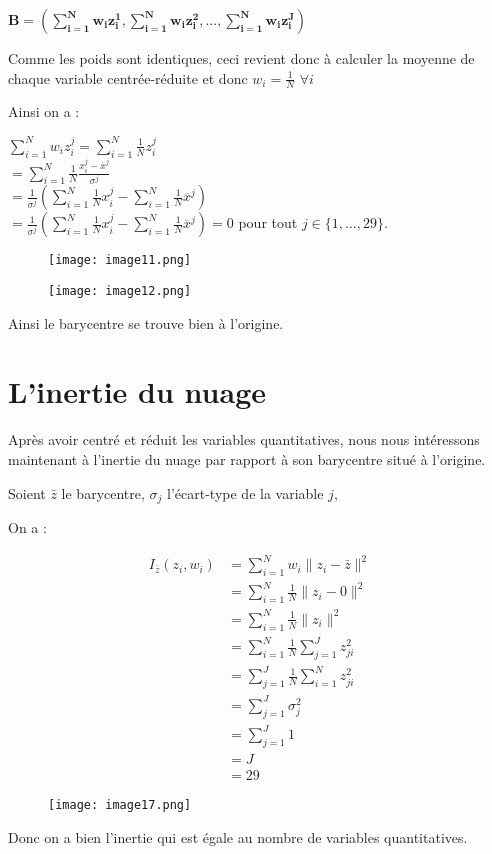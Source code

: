 \documentclass{article}
\begin{document}
$\mathbf{B=(\sum_{i=1}^{N}w_{i}z_{i}^{1},\sum_{i=1}^{N}w_{i}z_{i}^{2},...,\sum_{i=1}^{N}w_{i}z_{i}^{J})}$ 

Comme les poids sont identiques, ceci revient donc à calculer la moyenne de chaque variable centrée-réduite et donc $w_i=\frac{1}{N}$ $\forall i$

Ainsi on a : 

\begin{center}
$\sum_{i=1}^{N}w_{i}z_{i}^{j} = \sum_{i=1}^{N}\frac{1}{N}z_{i}^{j}$ \\
$=\sum_{i=1}^{N}\frac{1}{N} \frac{x_{i}^{j}-\overline{x}^{j}}{\sigma^{j}}$ \\
$=\frac{1}{\sigma^{j}}\left(\sum_{i=1}^{N}\frac{1}{N}x_{i}^{j}-\sum_{i=1}^{N}\frac{1}{N}\overline{x}^{j}\right)$ \\ 
$=\frac{1}{\sigma^{j}}\left(\sum_{i=1}^{N}\frac{1}{N}x_{i}^{j}-\sum_{i=1}^{N}\frac{1}{N}\overline{x}^{j}\right) = 0$ pour tout \(j \in \{1, \ldots, 29\}\).
\end{center}


\begin{figure}[h]
    \centering
    \texttt{[image: image11.png]}
    \label{fig:enter-label}
\end{figure}

\begin{figure}[h]
    \centering
    \texttt{[image: image12.png]}
    \label{fig:enter-label}
\end{figure}
Ainsi le barycentre se trouve bien à l'origine. 


\section{L'inertie du nuage}

Après avoir centré et réduit les variables quantitatives, nous nous intéressons maintenant à l'inertie du nuage par rapport à son barycentre situé à l'origine.

Soient $\bar{z}$ le barycentre, $\sigma_j$ l'écart-type de la variable $j$,

On a :
\begin{center}
\begin{align*}
I_{\bar{z}}(z_i, w_i) &= \sum_{i=1}^N w_i\|z_i - \bar{z}\|^2 \\
&= \sum_{i=1}^N \frac{1}{N}\|z_i - 0\|^2 \\
&= \sum_{i=1}^N \frac{1}{N}\|z_i\|^2 \\
&= \sum_{i=1}^N \frac{1}{N}\sum_{j=1}^J z_{ji}^2 \\
&= \sum_{j=1}^J \frac{1}{N}\sum_{i=1}^N z_{ji}^2 \\
&= \sum_{j=1}^J \sigma_j^2 \\
&= \sum_{j=1}^J 1 \\
&= J \\
&= 29
\end{align*}
\end{center}

\begin{figure}[H]
    \centering
    \texttt{[image: image17.png]}
    \label{fig:enter-label}
\end{figure}

Donc on a bien l'inertie qui est égale au nombre de variables quantitatives.
\end{document}
